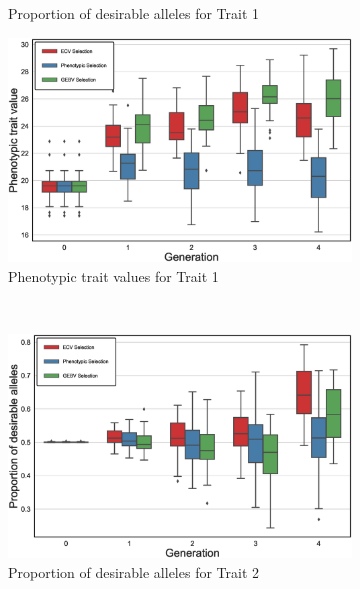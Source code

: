 \documentclass[12pt, a4paper, bibliography=totoc]{scrartcl}
\begin{document}
\begin{figure}[htb!]
\begin{subfigure}[h!t]{0.4\textwidth}
    \caption{Proportion of desirable alleles for Trait 1}\label{fig.3c}
    \end{subfigure}
    \hfill
    \begin{subfigure}[h!t]{0.4\textwidth}
    \centering
    \includegraphics[scale=0.25]{Figures/MO_pheno_values_trait1.eps}
    \caption{Phenotypic trait values for Trait 1}\label{fig.3d}
    \end{subfigure}
    \\
    \begin{subfigure}[h!t]{0.4\textwidth}
    \centering
    \includegraphics[scale=0.25]{Figures/MO_proportion_trait2.eps}
    \caption{Proportion of desirable alleles for Trait 2}\label{fig.3e}
    \end{subfigure}
    \hfill
    \begin{subfigure}[h!t]{0.4\textwidth}
    \centering

\end{subfigure}
\end{figure}
\end{document}
